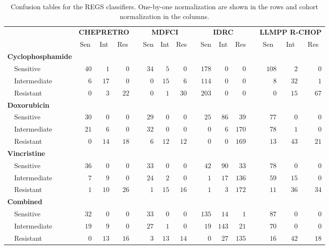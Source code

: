 \begin{table}[!tbp]
\begin{adjustwidth}{-1.5in}{0in}
{\small
\caption{Confusion tables for the REGS classifiers.
One-by-one normalization are shown in the rows and cohort normalization in the
columns.\label{tab:confusiondrugonebyone}} 
\begin{center}
\begin{tabular}{lrrrcrrrcrrrcrrr}
\hline\hline
\multicolumn{1}{l}{\bfseries }&\multicolumn{3}{c}{\bfseries CHEPRETRO}&\multicolumn{1}{c}{\bfseries }&\multicolumn{3}{c}{\bfseries MDFCI}&\multicolumn{1}{c}{\bfseries }&\multicolumn{3}{c}{\bfseries IDRC}&\multicolumn{1}{c}{\bfseries }&\multicolumn{3}{c}{\bfseries LLMPP R-CHOP}\tabularnewline
\cline{2-4} \cline{6-8} \cline{10-12} \cline{14-16}
\multicolumn{1}{l}{}&\multicolumn{1}{c}{Sen}&\multicolumn{1}{c}{Int}&\multicolumn{1}{c}{Res}&\multicolumn{1}{c}{}&\multicolumn{1}{c}{Sen}&\multicolumn{1}{c}{Int}&\multicolumn{1}{c}{Res}&\multicolumn{1}{c}{}&\multicolumn{1}{c}{Sen}&\multicolumn{1}{c}{Int}&\multicolumn{1}{c}{Res}&\multicolumn{1}{c}{}&\multicolumn{1}{c}{Sen}&\multicolumn{1}{c}{Int}&\multicolumn{1}{c}{Res}\tabularnewline
\hline
{\bfseries Cyclophosphamide}&&&&&&&&&&&&&&&\tabularnewline
~~Sensitive&$40$&$ 1$&$ 0$&&$34$&$ 5$&$ 0$&&$178$&$  0$&$  0$&&$108$&$ 2$&$ 0$\tabularnewline
~~Intermediate&$ 6$&$17$&$ 0$&&$ 0$&$15$&$ 6$&&$114$&$  0$&$  0$&&$  8$&$32$&$ 1$\tabularnewline
~~Resistant&$ 0$&$ 3$&$22$&&$ 0$&$ 1$&$30$&&$203$&$  0$&$  0$&&$  0$&$15$&$67$\tabularnewline
\hline
{\bfseries Doxorubicin}&&&&&&&&&&&&&&&\tabularnewline
~~Sensitive&$30$&$ 0$&$ 0$&&$29$&$ 0$&$ 0$&&$ 25$&$ 86$&$ 39$&&$ 77$&$ 0$&$ 0$\tabularnewline
~~Intermediate&$21$&$ 6$&$ 0$&&$32$&$ 0$&$ 0$&&$  0$&$  6$&$170$&&$ 78$&$ 1$&$ 0$\tabularnewline
~~Resistant&$ 0$&$14$&$18$&&$ 6$&$12$&$12$&&$  0$&$  0$&$169$&&$ 13$&$43$&$21$\tabularnewline
\hline
{\bfseries Vincristine}&&&&&&&&&&&&&&&\tabularnewline
~~Sensitive&$36$&$ 0$&$ 0$&&$33$&$ 0$&$ 0$&&$ 42$&$ 90$&$ 33$&&$ 78$&$ 0$&$ 0$\tabularnewline
~~Intermediate&$ 7$&$ 9$&$ 0$&&$24$&$ 2$&$ 0$&&$  1$&$ 17$&$136$&&$ 59$&$15$&$ 0$\tabularnewline
~~Resistant&$ 1$&$10$&$26$&&$ 1$&$15$&$16$&&$  1$&$  3$&$172$&&$ 11$&$36$&$34$\tabularnewline
\hline
{\bfseries Combined}&&&&&&&&&&&&&&&\tabularnewline
~~Sensitive&$32$&$ 0$&$ 0$&&$33$&$ 0$&$ 0$&&$135$&$ 14$&$  1$&&$ 87$&$ 0$&$ 0$\tabularnewline
~~Intermediate&$19$&$ 9$&$ 0$&&$27$&$ 1$&$ 0$&&$ 19$&$143$&$ 21$&&$ 70$&$ 0$&$ 0$\tabularnewline
~~Resistant&$ 0$&$13$&$16$&&$ 3$&$13$&$14$&&$  0$&$ 27$&$135$&&$ 16$&$42$&$18$\tabularnewline
\hline
\end{tabular}\end{center}}
\end{adjustwidth}
\end{table}
